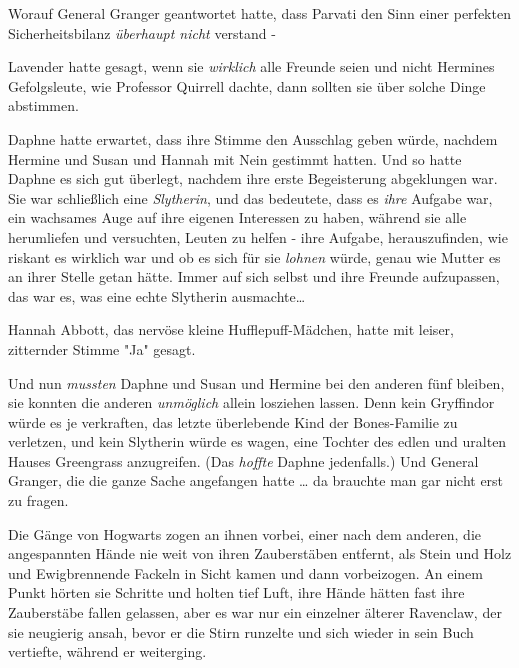 {Worauf General Granger geantwortet hatte, dass Parvati den Sinn einer perfekten Sicherheitsbilanz \emph{überhaupt nicht} verstand -

Lavender hatte gesagt, wenn sie \emph{wirklich} alle Freunde seien und nicht Hermines Gefolgsleute, wie Professor Quirrell dachte, dann sollten sie über solche Dinge abstimmen.

Daphne hatte erwartet, dass ihre Stimme den Ausschlag geben würde, nachdem Hermine und Susan und Hannah mit Nein gestimmt hatten. Und so hatte Daphne es sich gut überlegt, nachdem ihre erste Begeisterung abgeklungen war. Sie war schließlich eine \emph{Slytherin}, und das bedeutete, dass es \emph{ihre} Aufgabe war, ein wachsames Auge auf ihre eigenen Interessen zu haben, während sie alle herumliefen und versuchten, Leuten zu helfen - ihre Aufgabe, herauszufinden, wie riskant es wirklich war und ob es sich für sie \emph{lohnen} würde, genau wie Mutter es an ihrer Stelle getan hätte. Immer auf sich selbst und ihre Freunde aufzupassen, das war es, was eine echte Slytherin ausmachte…

Hannah Abbott, das nervöse kleine Hufflepuff-Mädchen, hatte mit leiser, zitternder Stimme "Ja" gesagt.

Und nun \emph{mussten} Daphne und Susan und Hermine bei den anderen fünf bleiben, sie konnten die anderen \emph{unmöglich} allein losziehen lassen. Denn kein Gryffindor würde es je verkraften, das letzte überlebende Kind der Bones-Familie zu verletzen, und kein Slytherin würde es wagen, eine Tochter des edlen und uralten Hauses Greengrass anzugreifen. (Das \emph{hoffte} Daphne jedenfalls.) Und General Granger, die die ganze Sache angefangen hatte … da brauchte man gar nicht erst zu fragen.

Die Gänge von Hogwarts zogen an ihnen vorbei, einer nach dem anderen, die angespannten Hände nie weit von ihren Zauberstäben entfernt, als Stein und Holz und Ewigbrennende Fackeln in Sicht kamen und dann vorbeizogen. An einem Punkt hörten sie Schritte und holten tief Luft, ihre Hände hätten fast ihre Zauberstäbe fallen gelassen, aber es war nur ein einzelner älterer Ravenclaw, der sie neugierig ansah, bevor er die Stirn runzelte und sich wieder in sein Buch vertiefte, während er weiterging.

}
